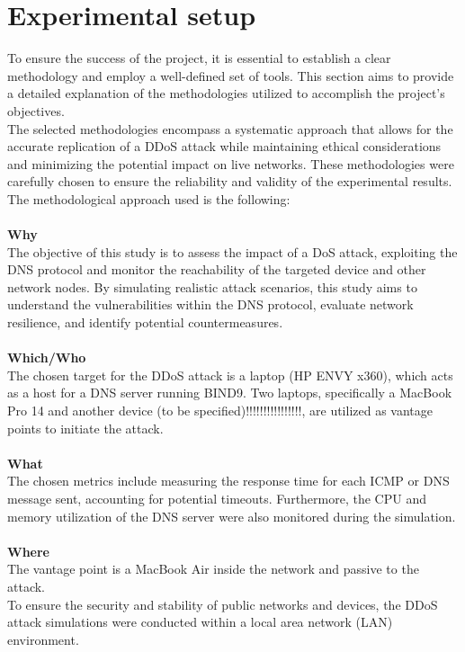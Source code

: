 \section{Experimental setup}

To ensure the success of the project, it is essential to establish a clear methodology and employ a well-defined set of tools.
This section aims to provide a detailed explanation of the methodologies utilized to accomplish the project's objectives.\\
The selected methodologies encompass a systematic approach that allows for the accurate replication of a
DDoS attack while maintaining ethical considerations and minimizing the potential impact on live networks.
These methodologies were carefully chosen to ensure the reliability and validity of the experimental results.
The methodological approach used is the following:\\
\\
\textbf{Why}\\
The objective of this study is to assess the impact of a DoS attack, exploiting the DNS protocol and monitor the reachability
of the targeted device and other network nodes.
By simulating realistic attack scenarios, this study aims to understand the vulnerabilities within the DNS protocol, evaluate network resilience,
and identify potential countermeasures.\\
\\
\textbf{Which/Who}\\
The chosen target for the DDoS attack is a laptop (HP ENVY x360), which acts as a host for a DNS server running BIND9.
Two laptops, specifically a MacBook Pro 14 and another device (to be specified)!!!!!!!!!!!!!!!!, are utilized as vantage points to initiate the attack.\\
\\
\textbf{What}\\
The chosen metrics include measuring the response time for each ICMP or DNS message sent, accounting for potential timeouts.
Furthermore, the CPU and memory utilization of the DNS server were also monitored during the simulation. \\
\\
\textbf{Where}\\
The vantage point is a MacBook Air inside the
network and passive to the attack.\\
To ensure the security and stability of public networks and devices,
the DDoS attack simulations were conducted within a local area network (LAN) environment.
